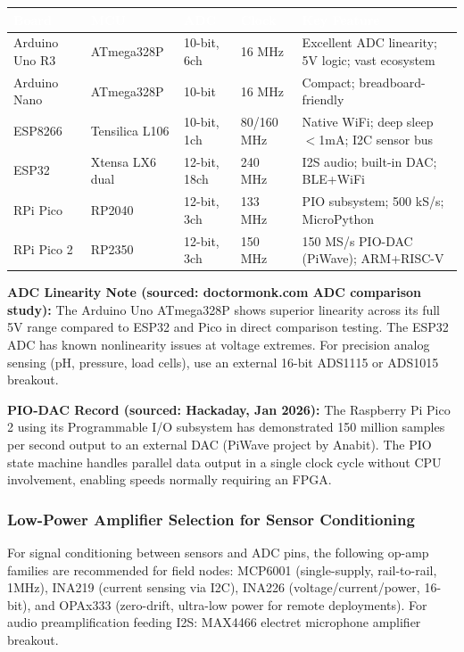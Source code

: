\documentclass[11pt,letterpaper]{article}
\newcommand{\tableheader}[1]{\textbf{\sffamily\textcolor{white}{#1}}}
\begin{document}
\begin{center}
\begin{tabularx}{\textwidth}{L{2.2cm}L{2.2cm}L{2.2cm}L{2.2cm}X}
\toprule
{}
\tableheader{Board} & \tableheader{MCU} & \tableheader{ADC} & \tableheader{Clock} & \tableheader{Key Feature} \\
\midrule
Arduino Uno R3 & ATmega328P & 10-bit, 6ch & 16 MHz & Excellent ADC linearity; 5V logic; vast ecosystem \\
Arduino Nano & ATmega328P & 10-bit & 16 MHz & Compact; breadboard-friendly \\
ESP8266 & Tensilica L106 & 10-bit, 1ch & 80/160 MHz & Native WiFi; deep sleep $<$1mA; I2C sensor bus \\
ESP32 & Xtensa LX6 dual & 12-bit, 18ch & 240 MHz & I2S audio; built-in DAC; BLE+WiFi \\
RPi Pico & RP2040 & 12-bit, 3ch & 133 MHz & PIO subsystem; 500 kS/s; MicroPython \\
RPi Pico 2 & RP2350 & 12-bit, 3ch & 150 MHz & 150 MS/s PIO-DAC (PiWave); ARM+RISC-V \\
\bottomrule
\end{tabularx}
\end{center}

\textbf{ADC Linearity Note (sourced: doctormonk.com ADC comparison study):} The Arduino Uno ATmega328P shows superior linearity across its full 5V range compared to ESP32 and Pico in direct comparison testing. The ESP32 ADC has known nonlinearity issues at voltage extremes. For precision analog sensing (pH, pressure, load cells), use an external 16-bit ADS1115 or ADS1015 breakout.

\textbf{PIO-DAC Record (sourced: Hackaday, Jan 2026):} The Raspberry Pi Pico 2 using its Programmable I/O subsystem has demonstrated 150 million samples per second output to an external DAC (PiWave project by Anabit). The PIO state machine handles parallel data output in a single clock cycle without CPU involvement, enabling speeds normally requiring an FPGA.

\subsubsection{Low-Power Amplifier Selection for Sensor Conditioning}

For signal conditioning between sensors and ADC pins, the following op-amp families are recommended for field nodes: MCP6001 (single-supply, rail-to-rail, 1MHz), INA219 (current sensing via I2C), INA226 (voltage/current/power, 16-bit), and OPAx333 (zero-drift, ultra-low power for remote deployments). For audio preamplification feeding I2S: MAX4466 electret microphone amplifier breakout.
\end{document}
